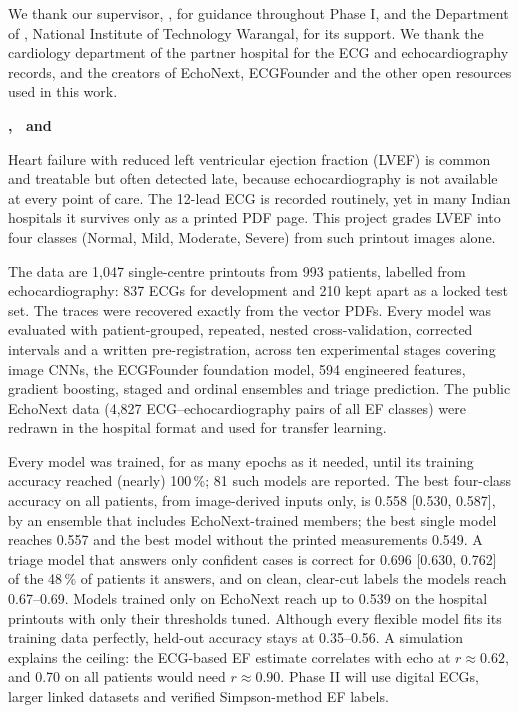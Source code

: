 \thispagestyle{empty}
We thank our supervisor, \Guide, for guidance throughout Phase I, and the Department of \Dept, National Institute of Technology Warangal, for its support. We thank the cardiology department of the partner hospital for the ECG and echocardiography records, and the creators of EchoNext, ECGFounder and the other open resources used in this work.

\vspace{24pt}
\hfill\textbf{\StudentA, \StudentB\ and \StudentC}
\clearpage

\fancyhead[L]{}\fancyhead[R]{\thepage}
Heart failure with reduced left ventricular ejection fraction (LVEF) is common and treatable but often detected late, because echocardiography is not available at every point of care. The 12-lead ECG is recorded routinely, yet in many Indian hospitals it survives only as a printed PDF page. This project grades LVEF into four classes (Normal, Mild, Moderate, Severe) from such printout images alone.

The data are 1,047 single-centre printouts from 993 patients, labelled from echocardiography: 837 ECGs for development and 210 kept apart as a locked test set. The traces were recovered exactly from the vector PDFs. Every model was evaluated with patient-grouped, repeated, nested cross-validation, corrected intervals and a written pre-registration, across ten experimental stages covering image CNNs, the ECGFounder foundation model, 594 engineered features, gradient boosting, staged and ordinal ensembles and triage prediction. The public EchoNext data (4,827 ECG--echocardiography pairs of all EF classes) were redrawn in the hospital format and used for transfer learning.

Every model was trained, for as many epochs as it needed, until its training accuracy reached (nearly) 100\,\%; 81 such models are reported. The best four-class accuracy on all patients, from image-derived inputs only, is 0.558 [0.530, 0.587], by an ensemble that includes EchoNext-trained members; the best single model reaches 0.557 and the best model without the printed measurements 0.549. A triage model that answers only confident cases is correct for 0.696 [0.630, 0.762] of the 48\,\% of patients it answers, and on clean, clear-cut labels the models reach 0.67--0.69. Models trained only on EchoNext reach up to 0.539 on the hospital printouts with only their thresholds tuned. Although every flexible model fits its training data perfectly, held-out accuracy stays at 0.35--0.56. A simulation explains the ceiling: the ECG-based EF estimate correlates with echo at $r\approx0.62$, and 0.70 on all patients would need $r\approx0.90$. Phase II will use digital ECGs, larger linked datasets and verified Simpson-method EF labels.


